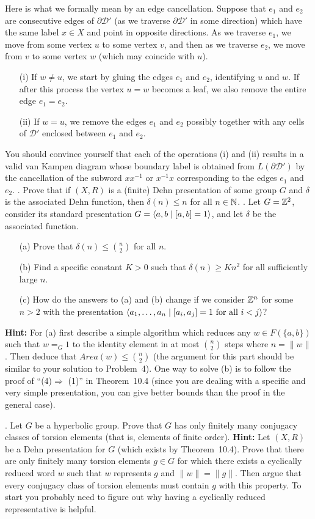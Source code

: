 \documentclass[12pt]{amsart}
\begin{document}
Here is what we formally mean by an edge cancellation. Suppose that $e_1$ and $e_2$
are consecutive edges of $\partial \mathcal D'$ (as we traverse $\partial \mathcal D'$ in some direction) which have the same label $x\in X$ and point in opposite directions.
As we traverse $e_1$, we move from some vertex $u$ to some vertex $v$, and then
as we traverse $e_2$, we move from $v$ to some vertex $w$ (which may coincide with $u$).

\begin{itemize}
\item[(i)] If $w\neq u$, we start by gluing the edges $e_1$ and $e_2$, identifying 
$u$ and $w$. If after this process the vertex $u=w$ becomes a leaf, we also remove the entire edge $e_1=e_2$.
\item[(ii)] If $w=u$, we remove the edges $e_1$ and $e_2$ possibly together with any cells of $\mathcal D'$ enclosed between $e_1$ and $e_2$.
\end{itemize}
You should convince yourself that each of the operations (i) and (ii) results in a valid van Kampen diagram whose boundary label is obtained from $L(\partial \mathcal D')$
by the cancellation of the subword $x x^{-1}$ or $x^{-1} x$ corresponding to the edges
$e_1$ and $e_2$.
. Prove that if $(X,R)$ is a (finite) Dehn presentation of some group $G$ and $\delta$ is the associated Dehn function,
then $\delta(n)\leq n$ for all $n\in{\mathbb N}$.
. Let $G={\mathbb Z}^2$, consider its standard presentation $G={\langle} a,b\mid [a,b]=1{\rangle}$, and let $\delta$ be the associated function.
\begin{itemize}
\item[(a)] Prove that $\delta(n)\leq {n\choose 2}$ for all $n$.
\item[(b)] Find a specific constant $K>0$ such that $\delta(n)\geq Kn^2$ for all sufficiently large $n$.
\item[(c)] How do the answers to (a) and (b) change if we consider ${\mathbb Z}^n$ for some $n>2$ with the presentation 
${\langle} a_1,\ldots, a_n \mid [a_i,a_j]=1 \mbox{ for all }i<j{\rangle}$?
\end{itemize}
{\bf Hint:} For (a) first describe a simple algorithm which reduces any 
$w\in F(\{a,b\})$ such that $w=_{G}1$ to the identity element in at most 
${n\choose 2}$ steps where $n=\|w\|$. Then deduce that $Area(w)\leq {n\choose 2}$
(the argument for this part should be similar to your solution to Problem~4). One way to solve (b) is to follow the proof of ``(4)$\Rightarrow$ (1)'' in Theorem~10.4 (since you are dealing with a specific and very simple presentation, you can give better bounds than the proof in the general case). 

. Let $G$ be a hyperbolic group. Prove that $G$ has only finitely many conjugacy classes of torsion elements (that is, elements of finite order). {\bf Hint:} Let
$(X,R)$ be a Dehn presentation for $G$ (which exists by Theorem~10.4). Prove that
there are only finitely many torsion elements $g\in G$ for which there exists a cyclically reduced word $w$
such that $w$ represents $g$ and $\|w\|=\|g\|$. Then argue that every conjugacy class of torsion elements
must contain $g$ with this property. To start you probably need to figure out why having a
cyclically reduced representative is helpful.
\end{document}
